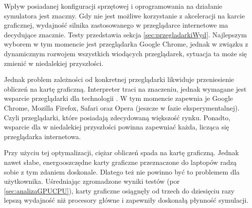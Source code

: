 Wpływ posiadanej konfiguracji sprzętowej i oprogramowania na działanie
symulatora jest znaczny. Gdy nie jest możliwe korzystanie z akceleracji na
karcie graficznej, wydajność silnika  zastosowanego w
przeglądarce internetowe ma decydujące znacznie. Testy przedstawia sekcja
\ref{sec:przegladarkiWyd}. Najlepszym wyborem w tym momencie jest przeglądarka
Google Chrome, jednak w związku z dynamicznym rozwojem wszystkich wiodących
przeglądarek, sytuacja ta może się zmienić w niedalekiej przyszłości.

Jednak problem zależności od konkretnej przeglądarki likwiduje przeniesienie
obliczeń na kartę graficzną. Interpreter  traci na znaczeniu,
jednak wymagane jest wsparcie przeglądarki dla technologii . W tym
momencie zapewnia je Google Chrome, Mozilla Firefox, Safari oraz Opera (jeszcze
w fazie eksperymentalnej). Czyli przeglądarki, które posiadają zdecydowaną
większość rynku. Ponadto, wsparcie dla  w niedalekiej przyszłości
powinna zapewniać każda, licząca się przeglądarka internetowa.

Przy użyciu tej optymalizacji, ciężar obliczeń spada na kartę graficzną. Jednak
nawet słabe, energooszczędne karty graficzne przeznaczone do laptopów radzą
sobie z tym zdaniem doskonale. Dlatego też nie powinno być to problemem dla
użytkownika. Uśredniając zgromadzone wyniki testów (por
\ref{sec:analizaGPUCPU}), karty graficzne osiągnęły od trzech do dziesięciu razy
lepszą wydajność niż procesory główne i zapewniły doskonałą płynność symulacji.

